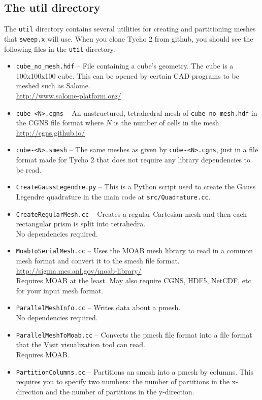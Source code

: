 \documentclass[12pt,letterpaper]{article}
\begin{document}
\subsection{The util directory}
The {\tt util} directory contains several utilities for creating and partitioning meshes that {\tt sweep.x} will use.
When you clone Tycho 2 from github, you should see the following files in the {\tt util} directory.
\begin{itemize}
\item {\tt cube\_no\_mesh.hdf} -- File containing a cube's geometry.  The cube is a 100x100x100 cube.  This can be opened by certain CAD programs to be meshed such as Salome.\\
\url{http://www.salome-platform.org/}
\item {\tt cube-<N>.cgns} -- An unstructured, tetrahedral mesh of {\tt cube\_no\_mesh.hdf} in the CGNS file format where $N$ is the number of cells in the mesh. \\
\url{http://cgns.github.io/}
\item {\tt cube-<N>.smesh} -- The same meshes as given by {\tt cube-<N>.cgns}, just in a file format made for Tycho 2 that does not require any library dependencies to be read.
\item {\tt CreateGaussLegendre.py} -- This is a Python script used to create the Gauss Legendre quadrature in the main code at {\tt src/Quadrature.cc}.
\item {\tt CreateRegularMesh.cc} -- Creates a regular Cartesian mesh and then each rectangular prism is split into tetrahedra. \\
{\color{red} No dependencies required.}
\item {\tt MoabToSerialMesh.cc} -- Uses the MOAB mesh library to read in a common mesh format and convert it to the smesh file format. \\
\url{http://sigma.mcs.anl.gov/moab-library/} \\
{\color{red} Requires MOAB at the least.  May also require CGNS, HDF5, NetCDF, etc for your input mesh format.}
\item {\tt ParallelMeshInfo.cc} -- Writes data about a pmesh.\\
{\color{red} No dependencies required.}
\item {\tt ParallelMeshToMoab.cc} -- Converts the pmesh file format into a file format that the Visit visualization tool can read.\\
{\color{red} Requires MOAB.}
\item {\tt PartitionColumns.cc} -- Partitions an smesh into a pmesh by columns.  This requires you to specify two numbers: the number of partitions in the x-direction and the number of partitions in the y-direction. \\

\end{itemize}
\end{document}
